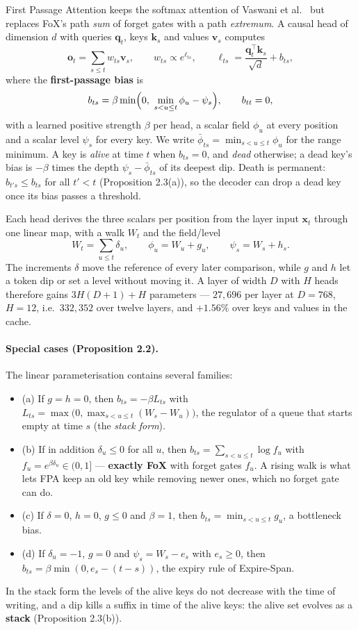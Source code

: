 First Passage Attention \citep{liu_first_passage_2026} keeps the softmax attention of Vaswani et al.~\citep{vaswani_attention_2017} but replaces FoX's path \emph{sum} of forget gates with a path \emph{extremum}. A causal head of dimension $d$ with queries $\mathbf{q}_t$, keys $\mathbf{k}_s$ and values $\mathbf{v}_s$ computes
\[
\mathbf{o}_t=\sum_{s\le t}w_{ts}\mathbf{v}_s,\qquad w_{ts}\propto e^{\ell_{ts}},\qquad
\ell_{ts}=\frac{\mathbf{q}_t^\top\mathbf{k}_s}{\sqrt{d}}+b_{ts},
\]
where the \textbf{first-passage bias} is
\[
b_{ts}=\beta\min\Bigl(0,\ \min_{s<u\le t}\phi_u-\psi_s\Bigr),\qquad b_{tt}=0,
\]
with a learned positive strength $\beta$ per head, a scalar field $\phi_u$ at every position and a scalar level $\psi_s$ for every key. We write $\bar{\phi}_{ts}=\min_{s<u\le t}\phi_u$ for the range minimum. A key is \emph{alive} at time $t$ when $b_{ts}=0$, and \emph{dead} otherwise; a dead key's bias is $-\beta$ times the depth $\psi_s-\bar{\phi}_{ts}$ of its deepest dip. Death is permanent: $b_{t's}\le b_{ts}$ for all $t'<t$ (Proposition 2.3(a)), so the decoder can drop a dead key once its bias passes a threshold.

Each head derives the three scalars per position from the layer input $\mathbf{x}_t$ through one linear map, with a walk $W_t$ and the field/level
\[
W_t=\sum_{u\le t}\delta_u,\qquad \phi_u=W_u+g_u,\qquad \psi_s=W_s+h_s .
\]
The increments $\delta$ move the reference of every later comparison, while $g$ and $h$ let a token dip or set a level without moving it. A layer of width $D$ with $H$ heads therefore gains $3H(D+1)+H$ parameters --- $27{,}696$ per layer at $D=768$, $H=12$, i.e.\ $332{,}352$ over twelve layers, and $+1.56\%$ over keys and values in the cache.

\paragraph{Special cases (Proposition 2.2).} The linear parameterisation contains several families:
\begin{itemize}[leftmargin=*]
    \item (a) If $g=h=0$, then $b_{ts}=-\beta L_{ts}$ with $L_{ts}=\max\bigl(0,\max_{s<u\le t}(W_s-W_u)\bigr)$, the regulator of a queue that starts empty at time $s$ (the \emph{stack form}).
    \item (b) If in addition $\delta_u\le 0$ for all $u$, then $b_{ts}=\sum_{s<u\le t}\log f_u$ with $f_u=e^{\beta\delta_u}\in(0,1]$ --- \textbf{exactly FoX} with forget gates $f_u$. A rising walk is what lets FPA keep an old key while removing newer ones, which no forget gate can do.
    \item (c) If $\delta=0$, $h=0$, $g\le 0$ and $\beta=1$, then $b_{ts}=\min_{s<u\le t}g_u$, a bottleneck bias.
    \item (d) If $\delta_u=-1$, $g=0$ and $\psi_s=W_s-e_s$ with $e_s\ge 0$, then $b_{ts}=\beta\min(0,e_s-(t-s))$, the expiry rule of Expire-Span.
\end{itemize}
In the stack form the levels of the alive keys do not decrease with the time of writing, and a dip kills a suffix in time of the alive keys: the alive set evolves as a \textbf{stack} (Proposition 2.3(b)).

